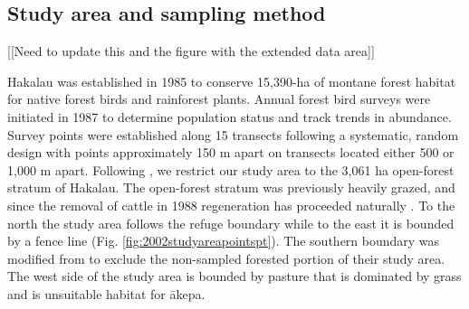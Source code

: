 \documentclass[preprint,12pt]{elsarticle}
\newcommand{\akepa}{\textquotesingle\={a}kepa}  %
\begin{document}
\subsection{Study area and sampling method}

[[Need to update this and the figure with the extended data area]]

Hakalau was established in 1985 to conserve 15,390-ha of montane forest habitat for native forest birds and rainforest plants. Annual forest bird surveys were initiated in 1987 to determine population status and track trends in abundance. Survey points were established along 15 transects following a systematic, random design with points approximately 150 m apart on transects located either 500 or 1,000 m apart. Following \cite{camp_population_2010, camp_statespace_2016}, we restrict our study area to the 3,061 ha open-forest stratum of Hakalau.  The open-forest stratum was previously heavily grazed, and since the removal of cattle in 1988 regeneration has proceeded naturally \citep{maxfield_hakalau_1998}. To the north the study area follows the refuge boundary while to the east it is bounded by a fence line (Fig. \ref{fig:2002studyareapointspt}). The southern boundary was modified from \cite{camp_population_2010} to exclude the non-sampled forested portion of their study area. The west side of the study area is bounded by pasture that is dominated by grass and is unsuitable habitat for \akepa.
\end{document}
